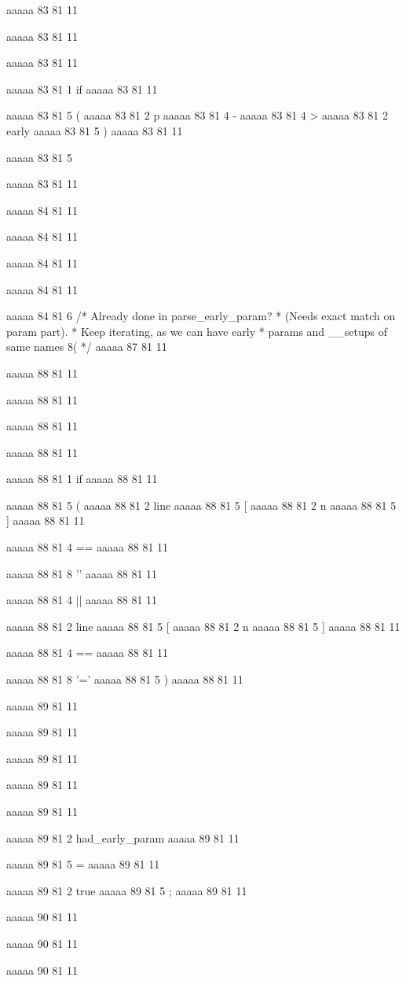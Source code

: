 {{{aaaaa 83 81
11
	
aaaaa 83 81
11
	
aaaaa 83 81
11
	
aaaaa 83 81
1
if
aaaaa 83 81
11
 
aaaaa 83 81
5
(
aaaaa 83 81
2
p
aaaaa 83 81
4
-
aaaaa 83 81
4
>
aaaaa 83 81
2
early
aaaaa 83 81
5
)
aaaaa 83 81
11
 
aaaaa 83 81
5
{
aaaaa 83 81
11


aaaaa 84 81
11
	
aaaaa 84 81
11
	
aaaaa 84 81
11
	
aaaaa 84 81
11
	
aaaaa 84 81
6
/* Already done in parse_early_param?
				 * (Needs exact match on param part).
				 * Keep iterating, as we can have early
				 * params and __setups of same names 8( */
aaaaa 87 81
11


aaaaa 88 81
11
	
aaaaa 88 81
11
	
aaaaa 88 81
11
	
aaaaa 88 81
11
	
aaaaa 88 81
1
if
aaaaa 88 81
11
 
aaaaa 88 81
5
(
aaaaa 88 81
2
line
aaaaa 88 81
5
[
aaaaa 88 81
2
n
aaaaa 88 81
5
]
aaaaa 88 81
11
 
aaaaa 88 81
4
==
aaaaa 88 81
11
 
aaaaa 88 81
8
'\0'
aaaaa 88 81
11
 
aaaaa 88 81
4
||
aaaaa 88 81
11
 
aaaaa 88 81
2
line
aaaaa 88 81
5
[
aaaaa 88 81
2
n
aaaaa 88 81
5
]
aaaaa 88 81
11
 
aaaaa 88 81
4
==
aaaaa 88 81
11
 
aaaaa 88 81
8
'='
aaaaa 88 81
5
)
aaaaa 88 81
11


aaaaa 89 81
11
	
aaaaa 89 81
11
	
aaaaa 89 81
11
	
aaaaa 89 81
11
	
aaaaa 89 81
11
	
aaaaa 89 81
2
had_early_param
aaaaa 89 81
11
 
aaaaa 89 81
5
=
aaaaa 89 81
11
 
aaaaa 89 81
2
true
aaaaa 89 81
5
;
aaaaa 89 81
11


aaaaa 90 81
11
	
aaaaa 90 81
11
	
aaaaa 90 81
11
	
}}}}
